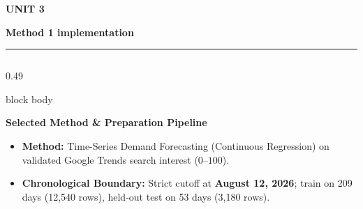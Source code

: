 \documentclass[aspectratio=169, 10pt]{beamer}
\newcommand{\slideheader}[3]{%
        \vspace{-0.25cm}%
        \noindent\begin{minipage}[t]{0.88\linewidth}%
            {\fontsize{7pt}{8.5pt}\selectfont \textbf{\color{BlueAccent}#1}}\par\vspace{1pt}%
            {\fontsize{11.5pt}{13.5pt}\selectfont \textbf{\color{NavyPrimary}#2}}%
        \end{minipage}%
        \hfill%
        \begin{minipage}[t]{0.10\linewidth}%
            \raggedleft{\fontsize{12pt}{14pt}\selectfont \textbf{\color{CoralAccent}#3}}%
        \end{minipage}\par%
        \vspace{2pt}%
        \textcolor{CardBorder}{\rule{\linewidth}{0.6pt}}\par%
        \vspace{3pt}%
    }
\newenvironment{card}[1][]{%
        \begin{beamercolorbox}[rounded=true,shadow=false,wd=\linewidth,sep=3.5pt,#1]{block body}%
        \fontsize{7.8pt}{9.8pt}\selectfont%
    }{%
        \end{beamercolorbox}%
    }
\begin{document}
    \begin{frame}[t]                                                                                                                                                                                   
        \slideheader{UNIT 3}{Method 1 implementation}{10}                                                                                                                                              
        \begin{columns}[T]                                                                                                                                                                             
            \begin{column}{0.49\textwidth}                                                                                                                                                             
                \begin{card}                                                                                                                                                                           
                    {\fontsize{8pt}{9.5pt}\selectfont \textbf{\color{NavyPrimary}Selected Method \& Preparation Pipeline}}\\[0.06cm]                                                                   
                    \begin{itemize}\setlength{\itemsep}{2pt}                                                                                                                                           
                        \item \textbf{Method:} Time-Series Demand Forecasting (Continuous Regression) on validated Google Trends search interest ($0$--$100$).                                         
                        \item \textbf{Chronological Boundary:} Strict cutoff at \textbf{August 12, 2026}; train on 209 days (12,540 rows), held-out test on 53 days (3,180 rows).                      

\end{itemize}
\end{card}
\end{column}
\end{columns}
\end{frame}
\end{document}
